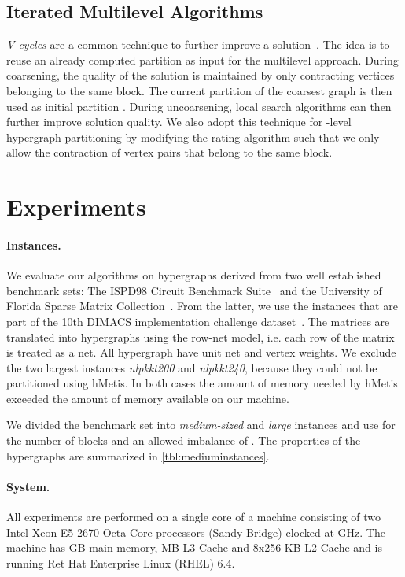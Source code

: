\documentclass[runningheads,a4paper]{llncs}
\begin{document}
\subsection{Iterated Multilevel Algorithms}  \label{GlobalSearch}
\emph{V-cycles} are a common technique 
to further improve a solution~\cite{hMetisRB,KahipWFCycles,WalshawVcycle}. The idea is to reuse an already computed partition as input for the multilevel approach. 
During coarsening, the quality of the solution is maintained by only contracting vertices
belonging to the same block. The current partition of the coarsest graph is then used as initial partition . During uncoarsening, local search 
algorithms can then further improve solution quality. 
We also adopt this technique for -level hypergraph partitioning by modifying the rating algorithm 
such that we only allow the contraction of vertex pairs that belong to the same block. 

\section{Experiments} \label{Experiments}
\paragraph{Instances.} \label{Instances}
We evaluate our algorithms on hypergraphs derived from two well established benchmark sets: The ISPD98 Circuit Benchmark Suite~\cite{ISPD98} and
the University of Florida Sparse Matrix Collection~\cite{FloridaSPM}. From the latter, we use the instances that are part of the 10th DIMACS implementation challenge dataset~\cite{benchmarksfornetworksanalysis}. The matrices are translated into hypergraphs using the row-net model, i.e. each row of the matrix
is treated as a net. All hypergraph have unit net and vertex weights. We exclude the two largest instances \emph{nlpkkt200} and \emph{nlpkkt240}, because they could not 
be partitioned using hMetis. In both cases the amount of memory needed by hMetis exceeded the amount of memory available on our machine.

We divided the benchmark set into \emph{medium-sized} and \emph{large} instances and use  for the number of blocks and an allowed imbalance of .
The properties of the hypergraphs are summarized in \autoref{tbl:mediuminstances}. 

\paragraph{System.}
All experiments are performed on a single core of a machine consisting of two Intel Xeon E5-2670 Octa-Core processors (Sandy Bridge) 
clocked at  GHz. The machine has  GB main memory,  MB L3-Cache and 8x256 KB L2-Cache and is running Ret Hat Enterprise Linux (RHEL) 6.4.
\end{document}
